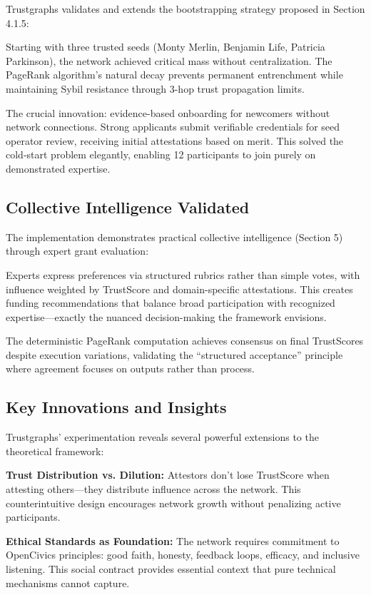Trustgraphs validates and extends the bootstrapping strategy proposed in Section 4.1.5:

Starting with three trusted seeds (Monty Merlin, Benjamin Life, Patricia Parkinson), the network achieved critical mass without centralization. The PageRank algorithm's natural decay prevents permanent entrenchment while maintaining Sybil resistance through 3-hop trust propagation limits.

The crucial innovation: evidence-based onboarding for newcomers without network connections. Strong applicants submit verifiable credentials for seed operator review, receiving initial attestations based on merit. This solved the cold-start problem elegantly, enabling 12 participants to join purely on demonstrated expertise.

\subsection{Collective Intelligence Validated}

The implementation demonstrates practical collective intelligence (Section 5) through expert grant evaluation:

Experts express preferences via structured rubrics rather than simple votes, with influence weighted by TrustScore and domain-specific attestations. This creates funding recommendations that balance broad participation with recognized expertise—exactly the nuanced decision-making the framework envisions.

The deterministic PageRank computation achieves consensus on final TrustScores despite execution variations, validating the ``structured acceptance'' principle where agreement focuses on outputs rather than process.

\subsection{Key Innovations and Insights}

Trustgraphs' experimentation reveals several powerful extensions to the theoretical framework:

\textbf{Trust Distribution vs. Dilution:} Attestors don't lose TrustScore when attesting others—they distribute influence across the network. This counterintuitive design encourages network growth without penalizing active participants.

\textbf{Ethical Standards as Foundation:} The network requires commitment to OpenCivics principles: good faith, honesty, feedback loops, efficacy, and inclusive listening. This social contract provides essential context that pure technical mechanisms cannot capture.

